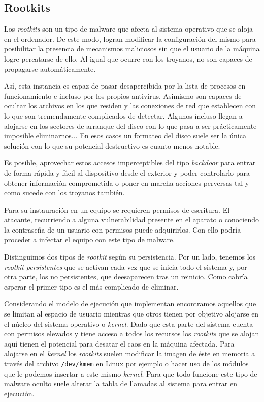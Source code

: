 \documentclass[12pt]{article}
\newcommand{\newpar} {
    \vskip 1cm
}
\begin{document}
        \subsection{Rootkits}
            Los \textit{rootkits} son un tipo de malware que afecta al sistema operativo que se aloja en el ordenador. De este modo, logran modificar la configuración del mismo para posibilitar la presencia de mecanismos maliciosos sin que el usuario de la máquina logre percatarse de ello. Al igual que ocurre con los troyanos, no son capaces de propagarse automáticamente.

            \newpar

            Así, esta instancia es capaz de pasar desapercibida por la lista de procesos en funcionamiento e incluso por los propios antivirus. Asimismo son capaces de ocultar los archivos en los que residen y las conexiones de red que establecen con lo que son tremendamente complicados de detectar. Algunos incluso llegan a alojarse en los sectores de arranque del disco con lo que pasa a ser prácticamente imposible eliminarnos... En esos casos un formateo del disco suele ser la única solución con lo que su potencial destructivo es cuanto menos notable.

            \newpar

            Es posible, aprovechar estos accesos imperceptibles del tipo \textit{backdoor} para entrar de forma rápida y fácil al dispositivo desde el exterior y poder controlarlo para obtener información comprometida o poner en marcha acciones perversas tal y como sucede con los troyanos también.

            \newpar

            Para su instauración en un equipo se requieren permisos de escritura. El atacante, recurriendo a alguna vulnerabilidad presente en el aparato o conociendo la contraseña de un usuario con permisos puede adquirirlos. Con ello podría proceder a infectar el equipo con este tipo de malware.

            \newpar

            Distinguimos dos tipos de \textit{rootkit} según su persistencia. Por un lado, tenemos los \textit{rootkit persistentes} que se activan cada vez que se inicia todo el sistema y, por otra parte, los no persistentes, que deesaparecen tras un reinicio. Como cabría esperar el primer tipo es el más complicado de eliminar.

            \newpar

            Considerando el modelo de ejecución que implementan encontramos aquellos que se limitan al espacio de usuario mientras que otros tienen por objetivo alojarse en el núcleo del sistema operativo o \textit{kernel}. Dado que esta parte del sistema cuenta con permisos elevados y tiene acceso a todos los recursos los \textit{rootkits} que se alojan aquí tienen el potencial para desatar el caos en la máquina afectada. Para alojarse en el \textit{kernel} los \textit{rootkits} suelen modificar la imagen de éste en memoria a través del archivo \texttt{/dev/kmem} en Linux por ejemplo o hacer uso de los módulos que le podemos insertar a este mismo \textit{kernel}. Para que todo funcione este tipo de malware oculto suele alterar la tabla de llamadas al sistema para entrar en ejecución.
\end{document}
